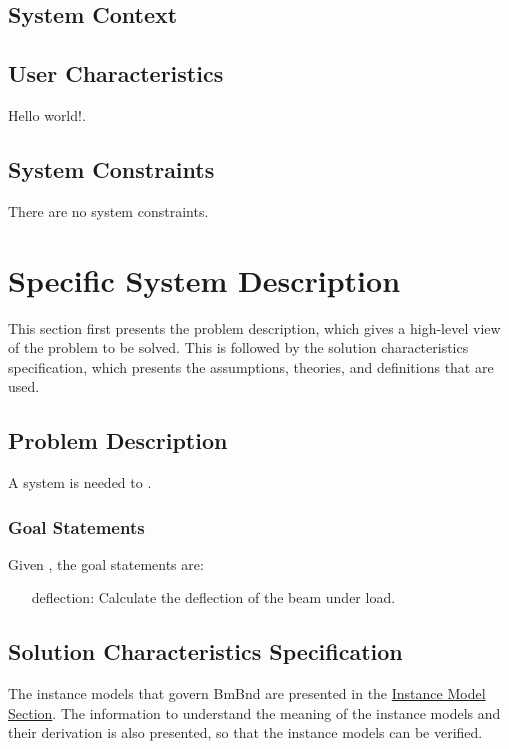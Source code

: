 \documentclass[12pt]{article}
\begin{document}
\subsection{System Context}
\label{Sec:SysContext}
\subsection{User Characteristics}
\label{Sec:UserChars}
Hello world!.

\subsection{System Constraints}
\label{Sec:SysConstraints}
There are no system constraints.

\section{Specific System Description}
\label{Sec:SpecSystDesc}
This section first presents the problem description, which gives a high-level view of the problem to be solved. This is followed by the solution characteristics specification, which presents the assumptions, theories, and definitions that are used.

\subsection{Problem Description}
\label{Sec:ProbDesc}
A system is needed to .

\subsubsection{Goal Statements}
\label{Sec:GoalStmt}
Given , the goal statements are:

\begin{itemize}
\item[deflection:\phantomsection\label{deflection}]{Calculate the deflection of the beam under load.}
\end{itemize}
\subsection{Solution Characteristics Specification}
\label{Sec:SolCharSpec}
The instance models that govern BmBnd are presented in the \hyperref[Sec:IMs]{Instance Model Section}. The information to understand the meaning of the instance models and their derivation is also presented, so that the instance models can be verified.
\end{document}
